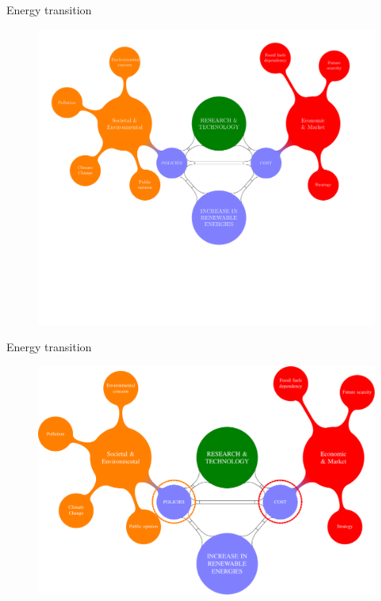 \documentclass{beamer}%
\begin{document}
\begin{frame}[fragile]{Energy transition}
\begin{figure}
\centering\includegraphics[scale=0.42]{diagram.pdf}
\end{figure} 
\end{frame}



\begin{frame}[fragile]{Energy transition}
\begin{figure}
\centering\includegraphics[scale=0.42]{diagram4.pdf}
\end{figure} 
\end{frame}
\end{document}
